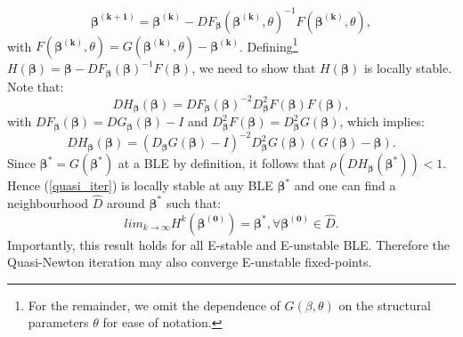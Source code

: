 \begin{appendix}
\begin{equation}
\label{quasi_iter}
\pmb{\beta^{(k+1)}} = \pmb{\beta^{(k)}} - DF_{\pmb{\beta}}(\pmb{\beta^{(k)}},\theta)^{-1}F(\pmb{\beta^{(k)}},\theta),
\end{equation}
with $F(\pmb{\beta^{(k)}},\theta) = G(\pmb{\beta^{(k)}},\theta)-\pmb{\beta^{(k)}}$. Defining\footnote{For the remainder, we omit the dependence of $G(\beta,\theta)$ on the structural parameters $\theta$ for ease of notation.} $H(\pmb{\beta})= \pmb{\beta}-DF_{\pmb{\beta}}(\pmb{\beta})^{-1}F(\pmb{\beta})$, we need to show that $H(\pmb{\beta})$ is locally stable. Note that:
$$DH_{\pmb{\beta}}(\pmb{\beta})=DF_{\pmb{\beta}}(\pmb{\beta})^{-2}D^2_{\pmb{\beta}}F(\pmb{\beta}) F(\pmb{\beta}),$$
with $DF_{\pmb{\beta}}(\pmb{\beta})=DG_{\pmb{\beta}}(\pmb{\beta})-I$ and $D^2_{\pmb{\beta}}F(\pmb{\beta})=D^2_{\pmb{\beta}}G(\pmb{\beta})$, which implies:
$$DH_{\pmb{\beta}}(\pmb{\beta})= (D_{\pmb{\beta}}G({\pmb{\beta}})-I)^{-2}D^2_{\pmb{\beta}}G(\pmb{\beta})(G(\pmb{\beta})- {\pmb{\beta}}).$$
Since ${\pmb{\beta}^{*}}=G({\pmb{\beta}}^{*})$ at a BLE by definition, it follows that $\rho(DH_{\pmb{\beta}}({\pmb{\beta^{*}}}))<1$. Hence (\ref{quasi_iter}) is locally stable at any BLE ${\pmb{\beta}^{*}}$ and one can find a neighbourhood $\hat{D}$ around ${\pmb{\beta}^{*}}$ such that:
\begin{equation}
lim_{k \rightarrow \infty} H^k(\pmb{\beta^{(0)}}) = \pmb{ \beta^{*}}, \forall \pmb{\beta^{(0)}} \in \hat{D}.
\end{equation}
 Importantly, this result holds for all E-stable and E-unstable BLE. Therefore the Quasi-Newton iteration may also converge E-unstable fixed-points.




\end{appendix}

